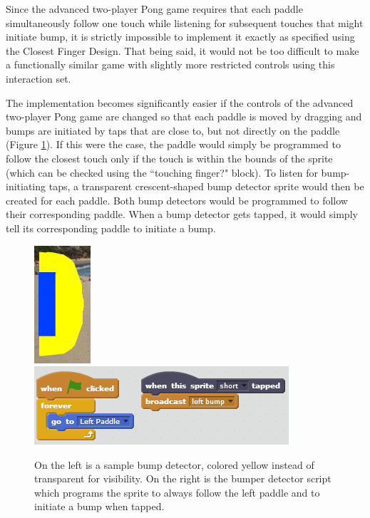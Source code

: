 Since the advanced two-player Pong game requires that each paddle simultaneously follow one touch while listening for subsequent touches that might initiate bump, it is strictly impossible to implement it exactly as specified using the Closest Finger Design. That being said, it would not be too difficult to make a functionally similar game with slightly more restricted controls using this interaction set. 

The implementation becomes significantly easier if the controls of the advanced two-player Pong game are changed so that each paddle is moved by dragging and bumps are initiated by taps that are close to, but not directly on the paddle (Figure \ref{LeftBumperBumperScript}). If this were the case, the paddle would simply be programmed to follow the closest touch only if the touch is within the bounds of the sprite (which can be checked using the ``touching finger?" block). To listen for bump-initiating taps, a transparent crescent-shaped bump detector sprite would then be created for each paddle. Both bump detectors would be programmed to follow their corresponding paddle. When a bump detector gets tapped, it would simply tell its corresponding paddle to initiate a bump.

\begin{figure}
\centering
\includegraphics{images/LeftBumper.PNG}
\includegraphics{images/BumperScript.PNG}
\caption[Sample Bumper Detector and Script for Alternate Advanced Two-Player Pong]{On the left is a sample bump detector, colored yellow instead of transparent for visibility. On the right is the bumper detector script which programs the sprite to always follow the left paddle and to initiate a bump when tapped.}
\label{LeftBumperBumperScript}
\end{figure}

